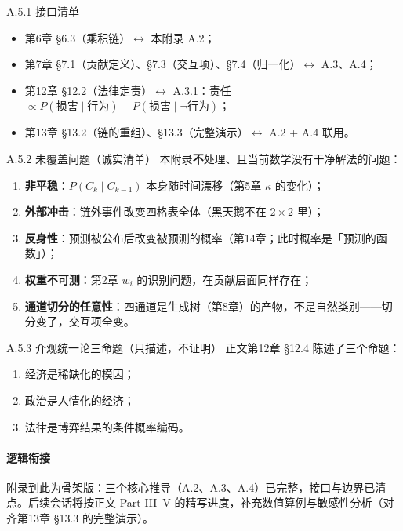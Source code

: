 \documentclass[../../main2.tex]{subfiles}
\begin{document}
	\begin{mathbox}{A.5.1 接口清单}
		\begin{itemize}
			\item 第6章 §6.3（乘积链）$\leftrightarrow$ 本附录 A.2；
			\item 第7章 §7.1（贡献定义）、§7.3（交互项）、§7.4（归一化）$\leftrightarrow$ A.3、A.4；
			\item 第12章 §12.2（法律定责）$\leftrightarrow$ A.3.1：责任 $\propto P(\text{损害} \mid \text{行为}) - P(\text{损害} \mid \neg \text{行为})$；
			\item 第13章 §13.2（链的重组）、§13.3（完整演示）$\leftrightarrow$ A.2 + A.4 联用。
		\end{itemize}
	\end{mathbox}

	\begin{mathbox}{A.5.2 未覆盖问题（诚实清单）}
		本附录\textbf{不}处理、且当前数学没有干净解法的问题：
		\begin{enumerate}
			\item \textbf{非平稳}：$P(C_k \mid C_{k-1})$ 本身随时间漂移（第5章 $\kappa$ 的变化）；
			\item \textbf{外部冲击}：链外事件改变四格表全体（黑天鹅不在 $2\times2$ 里）；
			\item \textbf{反身性}：预测被公布后改变被预测的概率（第14章；此时概率是「预测的函数」）；
			\item \textbf{权重不可测}：第2章 $w_i$ 的识别问题，在贡献层面同样存在；
			\item \textbf{通道切分的任意性}：四通道是生成树（第8章）的产物，不是自然类别——切分变了，交互项全变。
		\end{enumerate}
	\end{mathbox}

	\begin{mathbox}{A.5.3 介观统一论三命题（只描述，不证明）}
		正文第12章 §12.4 陈述了三个命题：
		\begin{enumerate}
			\item 经济是稀缺化的模因；
			\item 政治是人情化的经济；
			\item 法律是博弈结果的条件概率编码。
		\end{enumerate}
	\end{mathbox}

	\paragraph*{逻辑衔接}
	附录到此为骨架版：三个核心推导（A.2、A.3、A.4）已完整，接口与边界已清点。后续会话将按正文 Part III--V 的精写进度，补充数值算例与敏感性分析（对齐第13章 §13.3 的完整演示）。
\end{document}

